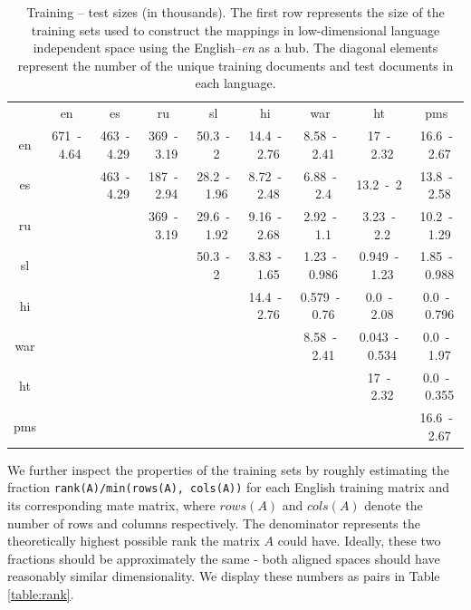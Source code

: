 \documentclass[twoside,11pt]{article}
\begin{document}
{
\renewcommand\tabcolsep{3pt}
\begin{table}[h!]
\centering
\caption{Training -- test sizes (in thousands).
The first row represents the size of the training sets used to construct the mappings in low-dimensional language independent space using the English--\emph{en} as a hub. The diagonal elements represent the number of the unique training documents and test documents in each language.
}
\label{table:train_test}
{
\small
\begin{tabular}{c|c|c|c|c|c|c|c|c|}
&	en&	es&	ru&	sl&	hi&	war&	ht&	pms\\\cline{1-9}
en&	671~-~4.64&	463~-~4.29&	369~-~3.19&	50.3~-~2&	14.4~-~2.76&	8.58~-~2.41&	 17~-~2.32&	16.6~-~2.67\\
\cline{2-9}
es&	\multicolumn{1}{c|}{}	&	463~-~4.29&	187~-~2.94&	28.2~-~1.96&	8.72~-~2.48&	 6.88~-~2.4&	13.2~-~2&	 13.8~-~2.58\\
\cline{3-9}
ru&	\multicolumn{2}{c|}{}	&	369~-~3.19&	29.6~-~1.92&	9.16~-~2.68&	2.92~-~1.1&	 3.23~-~2.2&	10.2~-~1.29\\
\cline{4-9}
sl&	\multicolumn{3}{c|}{}	&	50.3~-~2&	3.83~-~1.65&	1.23~-~0.986&	0.949~-~1.23&	 1.85~-~0.988\\
\cline{5-9}
hi&	\multicolumn{4}{c|}{}	&	14.4~-~2.76&	0.579~-~0.76&	0.0~-~2.08&	0.0~-~0.796\\
\cline{6-9}
war&	\multicolumn{5}{c|}{}	&	8.58~-~2.41&	0.043~-~0.534&	0.0~-~1.97\\
\cline{7-9}
ht&	\multicolumn{6}{c|}{}	&	17~-~2.32&	0.0~-~0.355\\
\cline{8-9}
pms&	\multicolumn{7}{c|}{}	&	16.6~-~2.67\\
\cline{9-9}
\end{tabular}
}
\end{table}
}

We further inspect the properties of the training sets by roughly estimating the fraction \texttt{rank(A)/min(rows(A), cols(A))} for each English training matrix and its corresponding mate matrix, where $rows(A)$ and $cols(A)$ denote the number of rows and columns respectively. The denominator represents the theoretically highest possible rank the matrix $A$ could have. Ideally, these two fractions should be approximately the same - both aligned spaces should have reasonably similar dimensionality. We display these numbers as pairs in Table \ref{table:rank}.
\end{document}
